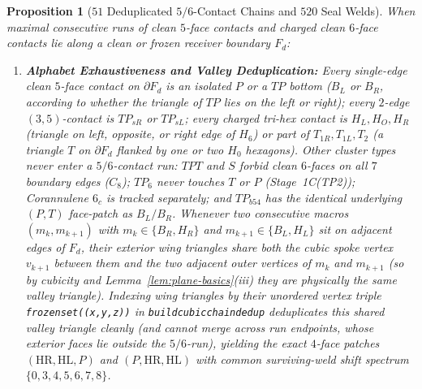 \documentclass[11pt,reqno]{amsart}
\theoremstyle{plain}
\newtheorem{proposition}[theorem]{Proposition}
\theoremstyle{definition}
\theoremstyle{remark}
\DeclareRobustCommand{\_}{\ifmmode\text{\textunderscore}\else\textunderscore\allowbreak\fi}
\begin{document}
\begin{proposition}[$51$ Deduplicated $5/6$-Contact Chains and $520$ Seal Welds]\label{prop:51chains}
When maximal consecutive runs of clean $5$-face contacts and charged clean $6$-face contacts lie along a clean or frozen receiver boundary $F_d$:
\begin{enumerate}[label=(\roman*),leftmargin=2.2em]
  \item \textbf{Alphabet Exhaustiveness and Valley Deduplication:} Every single-edge clean $5$-face contact on $\partial F_d$ is an isolated $P$ or a $TP$ bottom ($B_L$ or $B_R$, according to whether the triangle of $TP$ lies on the left or right); every $2$-edge $(3,5)$-contact is $TP_{sR}$ or $TP_{sL}$; every charged tri-hex contact is $H_L, H_O, H_R$ (triangle on left, opposite, or right edge of $H_6$) or part of $T_{1R}, T_{1L}, T_2$ (a triangle $T$ on $\partial F_d$ flanked by one or two $H_0$ hexagons). Other cluster types never enter a $5/6$-contact run: $TPT$ and $S$ forbid clean $6$-faces on all $7$ boundary edges ($C_8$); $TP_6$ never touches $T$ or $P$ (Stage~1C(TP2)); Corannulene $6_c$ is tracked separately; and $TP_{b54}$ has the identical underlying $(P, T)$ face-patch as $B_L/B_R$. Whenever two consecutive macros $(m_k, m_{k+1})$ with $m_k \in \{B_R, H_R\}$ and $m_{k+1} \in \{B_L, H_L\}$ sit on adjacent edges of $F_d$, their exterior wing triangles share both the cubic spoke vertex $v_{k+1}$ between them and the two adjacent outer vertices of $m_k$ and $m_{k+1}$ (so by cubicity and Lemma~\ref{lem:plane-basics}(iii) they are physically the same valley triangle). Indexing wing triangles by their unordered vertex triple \texttt{frozenset((x,y,z))} in \texttt{build\_cubic\_chain\_dedup} deduplicates this shared valley triangle cleanly (and cannot merge across run endpoints, whose exterior faces lie outside the $5/6$-run), yielding the exact $4$-face patches $(\mathrm{HR},\mathrm{HL},P)$ and $(P,\mathrm{HR},\mathrm{HL})$ with common surviving-weld shift spectrum $\{0, 3, 4, 5, 6, 7, 8\}$.

\end{enumerate}
\end{proposition}
\end{document}
